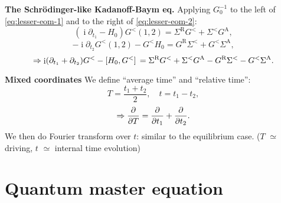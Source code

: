 \documentclass[t]{beamer}
\DeclareMathOperator{\ii}{i}
\begin{document}
\begin{frame}[allowframebreaks]
\framebreak

\textbf{The Schr\"{o}dinger-like Kadanoff-Baym eq.} Applying $G_0^{-1}$
to the left of \eqref{eq:lesser-eom-1} and to the right of \eqref{eq:lesser-eom-2}:
\begin{equation}
    (\ii \partial_{t_1} - H_0) G^<(1,2) = \Sigma^{\text{R}} G^< + \Sigma^< G^{\text{A}},
\end{equation}
\begin{equation}
    - \ii \partial_{t_2} G^<(1, 2) - G^< H_0 = G^{\text{R}} \Sigma^< + G^< \Sigma^{\text{A}},
\end{equation}
\begin{equation}
    \Rightarrow \ii (\partial_{t_1} + \partial_{t_2}) G^< - \comm*{H_0}{G^<} = 
    \Sigma^{\text{R}} G^< + \Sigma^< G^{\text{A}} - G^{\text{R}} \Sigma^< - G^< \Sigma^{\text{A}}.
\end{equation}

\vspace{0.25cm}

\textbf{Mixed coordinates} We define ``average time'' and ``relative time'':
\begin{equation}
    T = \frac{t_1 + t_2}{2}, \quad t = t_1 - t_2,
\end{equation}
\begin{equation}
    \Rightarrow \pdv{T} = \pdv{t_1} + \pdv{t_2}.
\end{equation}
We then do Fourier transform over $t$: 
similar to the equilibrium case. 
($T$ $\simeq$ driving, $t$ $\simeq$ internal time evolution)


\end{frame}



\section{Quantum master equation}
\end{document}
